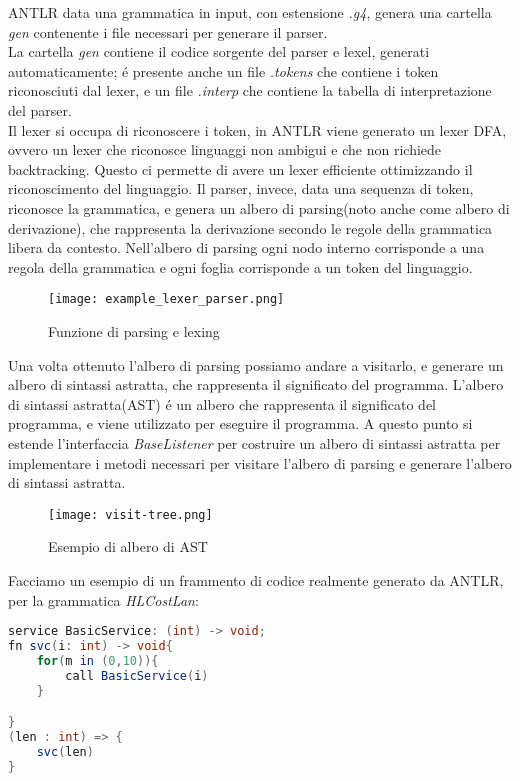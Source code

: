 \documentclass[../../main.tex]{subfiles}
\begin{document}
ANTLR data una grammatica in input, con estensione \textit{.g4}, genera una cartella \textit{gen} contenente i file necessari per generare il parser.\\
La cartella \textit{gen} contiene il codice sorgente del parser e lexel, generati automaticamente; é presente anche un file \textit{.tokens} che contiene i token riconosciuti dal lexer, e un file \textit{.interp} che contiene la tabella di interpretazione del parser.\\
Il lexer si occupa di riconoscere i token, in ANTLR viene generato un lexer DFA, ovvero un lexer che riconosce linguaggi non ambigui e che non richiede backtracking. Questo ci permette di avere un lexer efficiente ottimizzando il riconoscimento del linguaggio.
Il parser, invece, data una sequenza di token, riconosce la grammatica, e genera un albero di parsing(noto anche come albero di derivazione), che rappresenta la derivazione secondo le regole della grammatica libera da contesto. 
Nell'albero di parsing ogni nodo interno corrisponde a una regola della grammatica e ogni foglia corrisponde a un token del linguaggio.
\begin{figure}[H]
    \centering
    \texttt{[image: example\_lexer\_parser.png]}
    \caption{Funzione di parsing e lexing}
\end{figure}
Una volta ottenuto l'albero di parsing possiamo andare a visitarlo, e generare un albero di sintassi astratta, che rappresenta il significato del programma.
L'albero di sintassi astratta(AST) é un albero che rappresenta il significato del programma, e viene utilizzato per eseguire il programma.
A questo punto si estende l'interfaccia \textit{BaseListener} per costruire un albero di sintassi astratta per implementare i metodi necessari per visitare l'albero di parsing e generare l'albero di sintassi astratta.
\begin{figure}[H]
    \centering
    \texttt{[image: visit-tree.png]}
    \caption{Esempio di albero di AST}
    \label{fig:visit_tree}
\end{figure}

Facciamo un esempio di un frammento di codice realmente generato da ANTLR, per la grammatica \textit{HLCostLan}:
\begin{lstlisting}[language=Java, caption={Esempio di codice HLCostLan: example/Listing6}, label={lst:example_code}]
service BasicService: (int) -> void;
fn svc(i: int) -> void{
    for(m in (0,10)){
        call BasicService(i)
    }

}
(len : int) => {
	svc(len)
}
\end{lstlisting}
\end{document}
